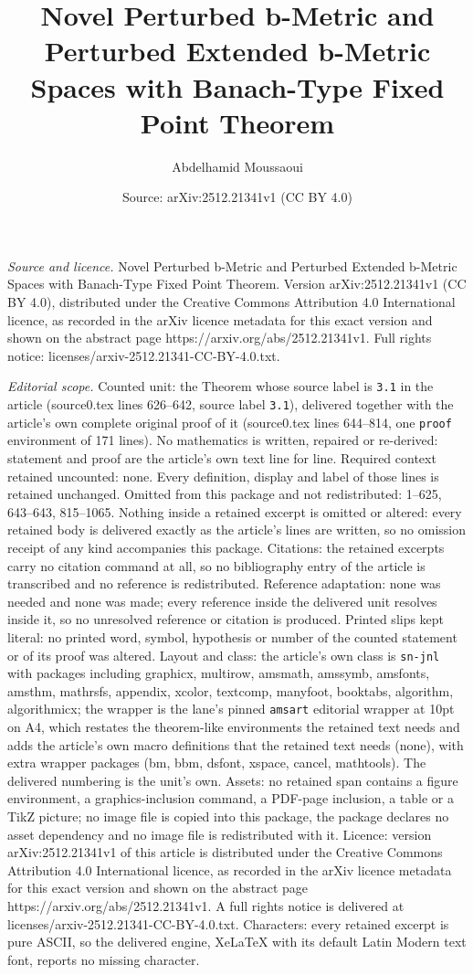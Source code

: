 \documentclass[10pt,a4paper]{amsart}
\title[Novel Perturbed b-Metric and Perturbed Extended b-Metric Spa]{Novel Perturbed b-Metric and Perturbed Extended b-Metric Spaces with Banach-Type Fixed Point Theorem}
\author{Abdelhamid Moussaoui}
\date{Source: arXiv:2512.21341v1 (CC BY 4.0)}
\begin{document}
\maketitle

\noindent\emph{Source and licence.} Novel Perturbed b-Metric and Perturbed Extended b-Metric Spaces with Banach-Type Fixed Point Theorem. Version arXiv:2512.21341v1 (CC BY 4.0), distributed under the Creative Commons Attribution 4.0 International licence, as recorded in the arXiv licence metadata for this exact version and shown on the abstract page https://arxiv.org/abs/2512.21341v1. Full rights notice: licenses/arxiv-2512.21341-CC-BY-4.0.txt.\par\smallskip

\noindent\textit{Editorial scope.} Counted unit: the Theorem whose source label is \texttt{3.1} in the article (source0.tex lines 626--642, source label \texttt{3.1}), delivered together with the article's own complete original proof of it (source0.tex lines 644--814, one \texttt{proof} environment of 171 lines). No mathematics is written, repaired or re-derived: statement and proof are the article's own text line for line. Required context retained uncounted: none. Every definition, display and label of those lines is retained unchanged. Omitted from this package and not redistributed: 1--625, 643--643, 815--1065. Nothing inside a retained excerpt is omitted or altered: every retained body is delivered exactly as the article's lines are written, so no omission receipt of any kind accompanies this package. Citations: the retained excerpts carry no citation command at all, so no bibliography entry of the article is transcribed and no reference is redistributed. Reference adaptation: none was needed and none was made; every reference inside the delivered unit resolves inside it, so no unresolved reference or citation is produced. Printed slips kept literal: no printed word, symbol, hypothesis or number of the counted statement or of its proof was altered. Layout and class: the article's own class is \texttt{sn-jnl} with packages including graphicx, multirow, amsmath, amssymb, amsfonts, amsthm, mathrsfs, appendix, xcolor, textcomp, manyfoot, booktabs, algorithm, algorithmicx; the wrapper is the lane's pinned \texttt{amsart} editorial wrapper at 10pt on A4, which restates the theorem-like environments the retained text needs and adds the article's own macro definitions that the retained text needs (none), with extra wrapper packages (bm, bbm, dsfont, xspace, cancel, mathtools). The delivered numbering is the unit's own. Assets: no retained span contains a figure environment, a graphics-inclusion command, a PDF-page inclusion, a table or a TikZ picture; no image file is copied into this package, the package declares no asset dependency and no image file is redistributed with it. Licence: version arXiv:2512.21341v1 of this article is distributed under the Creative Commons Attribution 4.0 International licence, as recorded in the arXiv licence metadata for this exact version and shown on the abstract page https://arxiv.org/abs/2512.21341v1. A full rights notice is delivered at licenses/arxiv-2512.21341-CC-BY-4.0.txt. Characters: every retained excerpt is pure ASCII, so the delivered engine, XeLaTeX with its default Latin Modern text font, reports no missing character.
\end{document}
